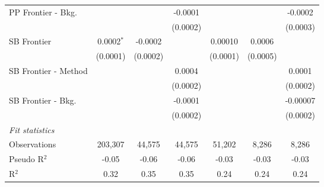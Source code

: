 \begin{tabular}{lcccccc}
   PP Frontier - Bkg.   &               &              & -0.0001        &                &                & -0.0002\\   
                        &               &              & (0.0002)       &                &                & (0.0003)\\   
   SB Frontier          & 0.0002$^{*}$  & -0.0002      &                & 0.00010        & 0.0006         &   \\   
                        & (0.0001)      & (0.0002)     &                & (0.0001)       & (0.0005)       &   \\   
   SB Frontier - Method &               &              & 0.0004         &                &                & 0.0001\\   
                        &               &              & (0.0002)       &                &                & (0.0002)\\   
   SB Frontier - Bkg.   &               &              & -0.0001        &                &                & -0.00007\\   
                        &               &              & (0.0002)       &                &                & (0.0002)\\   
   \midrule
   \emph{Fit statistics}\\
   Observations         & 203,307       & 44,575       & 44,575         & 51,202         & 8,286          & 8,286\\  
   Pseudo R$^2$         & -0.05         & -0.06        & -0.06          & -0.03          & -0.03          & -0.03\\  
   R$^2$                & 0.32          & 0.35         & 0.35           & 0.24           & 0.24           & 0.24\\  
   

\end{tabular}
